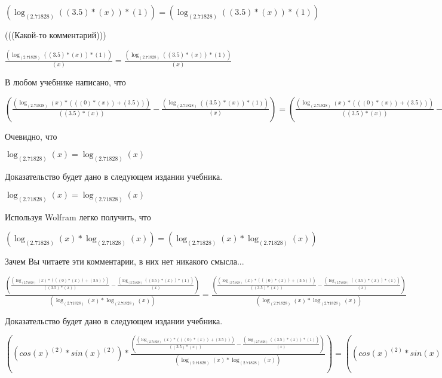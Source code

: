 \documentclass[12pt,a4paper,fleqn]{article}
\theoremstyle{definition}
\begin{document}
$(\log_{( 2.71828 )}{(( 3.5 ) * ( x ))} * ( 1 )) = (\log_{( 2.71828 )}{(( 3.5 ) * ( x ))} * ( 1 ))$

(((Какой-то комментарий)))

$\frac{(\log_{( 2.71828 )}{(( 3.5 ) * ( x ))} * ( 1 ))}{( x )}
 = \frac{(\log_{( 2.71828 )}{(( 3.5 ) * ( x ))} * ( 1 ))}{( x )}
$

В любом учебнике написано, что

$(\frac{(\log_{( 2.71828 )}{( x )} * ((( 0 ) * ( x )) + ( 3.5 )))}{(( 3.5 ) * ( x ))}
 - \frac{(\log_{( 2.71828 )}{(( 3.5 ) * ( x ))} * ( 1 ))}{( x )}
) = (\frac{(\log_{( 2.71828 )}{( x )} * ((( 0 ) * ( x )) + ( 3.5 )))}{(( 3.5 ) * ( x ))}
 - \frac{(\log_{( 2.71828 )}{(( 3.5 ) * ( x ))} * ( 1 ))}{( x )}
)$

Очевидно, что

$\log_{( 2.71828 )}{( x )} = \log_{( 2.71828 )}{( x )}$

Доказательство будет дано в следующем издании учебника.

$\log_{( 2.71828 )}{( x )} = \log_{( 2.71828 )}{( x )}$

Используя Wolfram легко получить, что

$(\log_{( 2.71828 )}{( x )} * \log_{( 2.71828 )}{( x )}) = (\log_{( 2.71828 )}{( x )} * \log_{( 2.71828 )}{( x )})$

Зачем Вы читаете эти комментарии, в них нет никакого смысла...

$\frac{(\frac{(\log_{( 2.71828 )}{( x )} * ((( 0 ) * ( x )) + ( 3.5 )))}{(( 3.5 ) * ( x ))}
 - \frac{(\log_{( 2.71828 )}{(( 3.5 ) * ( x ))} * ( 1 ))}{( x )}
)}{(\log_{( 2.71828 )}{( x )} * \log_{( 2.71828 )}{( x )})}
 = \frac{(\frac{(\log_{( 2.71828 )}{( x )} * ((( 0 ) * ( x )) + ( 3.5 )))}{(( 3.5 ) * ( x ))}
 - \frac{(\log_{( 2.71828 )}{(( 3.5 ) * ( x ))} * ( 1 ))}{( x )}
)}{(\log_{( 2.71828 )}{( x )} * \log_{( 2.71828 )}{( x )})}
$

Доказательство будет дано в следующем издании учебника.

$((cos{( x )}^{( 2 )} * sin{( x )}^{( 2 )}) * \frac{(\frac{(\log_{( 2.71828 )}{( x )} * ((( 0 ) * ( x )) + ( 3.5 )))}{(( 3.5 ) * ( x ))}
 - \frac{(\log_{( 2.71828 )}{(( 3.5 ) * ( x ))} * ( 1 ))}{( x )}
)}{(\log_{( 2.71828 )}{( x )} * \log_{( 2.71828 )}{( x )})}
) = ((cos{( x )}^{( 2 )} * sin{( x )}^{( 2 )}) * \frac{(\frac{(\log_{( 2.71828 )}{( x )} * ((( 0 ) * ( x )) + ( 3.5 )))}{(( 3.5 ) * ( x ))}
 - \frac{(\log_{( 2.71828 )}{(( 3.5 ) * ( x ))} * ( 1 ))}{( x )}
)}{(\log_{( 2.71828 )}{( x )} * \log_{( 2.71828 )}{( x )})}
)$
\end{document}
